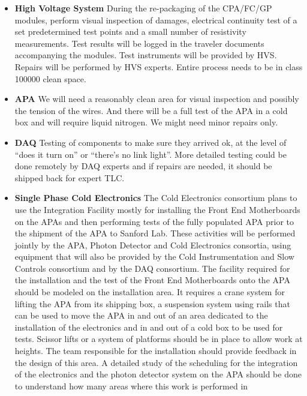 \begin{itemize}
  \item {\bf High Voltage System} During the re-packaging of the
    CPA/FC/GP modules, perform visual inspection of damages,
    electrical continuity test of a set predetermined test points and
    a small number of resistivity measurements.  Test results will be
    logged in the traveler documents accompanying the modules.  Test
    instruments will be provided by HVS.  Repairs will be performed by
    HVS experts. Entire process needs to be in class \num{100000} clean
    space.
  \item {\bf APA} We will need a reasonably clean area for visual
    inspection and possibly the tension of the wires.  And there will
    be a full test of the APA in a cold box and will require liquid
    nitrogen.  We might need minor repairs only.
  \item {\bf DAQ} Testing of components to make sure they arrived ok,
    at the level of ``does it turn on'' or ``there's no link light''.
    More detailed testing could be done remotely by DAQ experts and if
    repairs are needed, it should be shipped back for expert TLC.
  \item {\bf Single Phase Cold Electronics} The Cold Electronics
    consortium plans to use the Integration Facility mostly for
    installing the Front End Motherboards on the APAs and then
    performing tests of the fully populated APA prior to the shipment
    of the APA to Sanford Lab. These activities will be performed
    jointly by the APA, Photon Detector and Cold Electronics
    consortia, using equipment that will also be provided by the Cold
    Instrumentation and Slow Controls consortium and by the DAQ
    consortium. The facility required for the installation and the
    test of the Front End Motherboards onto the APA should be modeled
    on the  installation area. It requires a crane
    system for lifting the APA from its shipping box, a suspension
    system using rails that can be used to move the APA in and out of
    an area dedicated to the installation of the electronics and in
    and out of a cold box to be used for tests. Scissor lifts or a
    system of platforms should be in place to allow work at
    heights. The team responsible for the 
    installation should provide feedback in the design of this area. A
    detailed study of the scheduling for the integration of the
    electronics and the photon detector system on the APA should be
    done to understand how many areas where this work is performed in

\end{itemize}
